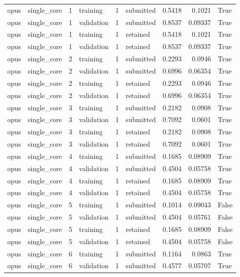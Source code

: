\begin{tabular}{llrlrlrrl}
opus & single\_core & 1 & training & 1 & submitted & 0.5418 & 0.1021 & True \\
opus & single\_core & 1 & validation & 1 & submitted & 0.8537 & 0.09337 & True \\
opus & single\_core & 1 & training & 1 & retained & 0.5418 & 0.1021 & True \\
opus & single\_core & 1 & validation & 1 & retained & 0.8537 & 0.09337 & True \\
opus & single\_core & 2 & training & 1 & submitted & 0.2293 & 0.0946 & True \\
opus & single\_core & 2 & validation & 1 & submitted & 0.6996 & 0.06354 & True \\
opus & single\_core & 2 & training & 1 & retained & 0.2293 & 0.0946 & True \\
opus & single\_core & 2 & validation & 1 & retained & 0.6996 & 0.06354 & True \\
opus & single\_core & 3 & training & 1 & submitted & 0.2182 & 0.0908 & True \\
opus & single\_core & 3 & validation & 1 & submitted & 0.7092 & 0.0601 & True \\
opus & single\_core & 3 & training & 1 & retained & 0.2182 & 0.0908 & True \\
opus & single\_core & 3 & validation & 1 & retained & 0.7092 & 0.0601 & True \\
opus & single\_core & 4 & training & 1 & submitted & 0.1685 & 0.08909 & True \\
opus & single\_core & 4 & validation & 1 & submitted & 0.4504 & 0.05758 & True \\
opus & single\_core & 4 & training & 1 & retained & 0.1685 & 0.08909 & True \\
opus & single\_core & 4 & validation & 1 & retained & 0.4504 & 0.05758 & True \\
opus & single\_core & 5 & training & 1 & submitted & 0.1014 & 0.09043 & False \\
opus & single\_core & 5 & validation & 1 & submitted & 0.4504 & 0.05761 & False \\
opus & single\_core & 5 & training & 1 & retained & 0.1685 & 0.08909 & False \\
opus & single\_core & 5 & validation & 1 & retained & 0.4504 & 0.05758 & False \\
opus & single\_core & 6 & training & 1 & submitted & 0.1164 & 0.0863 & True \\
opus & single\_core & 6 & validation & 1 & submitted & 0.4577 & 0.05707 & True \\

\end{tabular}
